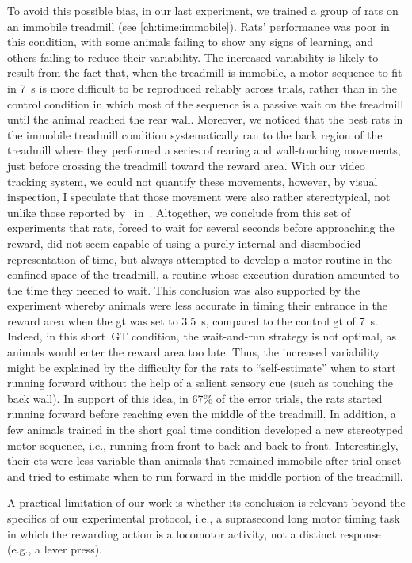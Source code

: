 To avoid this possible bias, in our last experiment, we trained a group of rats on an immobile treadmill (see \autoref{ch:time:immobile}).
Rats' performance was poor in this condition, with some animals failing to show any signs of learning, and others failing to reduce their variability.
The increased variability is likely to result from the fact that, when the treadmill is immobile, a motor sequence to fit in 7~s is more difficult to be reproduced reliably across trials, rather than in the control condition in which most of the sequence is a passive wait on the treadmill until the animal reached the rear wall.
Moreover, we noticed that the best rats in the immobile treadmill condition systematically ran to the back region of the treadmill where they performed a series of rearing and wall-touching movements, just before crossing the treadmill toward the reward area.
With our video tracking system, we could not quantify these movements, however, by visual inspection, I speculate that those movement were also rather stereotypical, not unlike those reported by~\citeauthor{Kawai2015} in~\cite{Kawai2015}.
Altogether, we conclude from this set of experiments that rats, forced to wait for several seconds before approaching the reward, did not seem capable of using a purely internal and disembodied representation of time, but always attempted to develop a motor routine in the confined space of the treadmill, a routine whose execution duration amounted to the time they needed to wait.
This conclusion was also supported by the experiment whereby animals were less accurate in timing their entrance in the reward area when the \gls{gt} was set to 3.5~s, compared to the control \gls{gt} of 7~s.
Indeed, in this short~GT condition, the wait-and-run strategy is not optimal, as animals would enter the reward area too late.
Thus, the increased variability might be explained by the difficulty for the rats to ``self-estimate'' when to start running forward without the help of a salient sensory cue (such as touching the back wall).
In support of this idea, in 67\% of the error trials, the rats started running forward before reaching even the middle of the treadmill.
In addition, a few animals trained in the short goal time condition developed a new stereotyped motor sequence, i.e., running from front to back and back to front.
Interestingly, their \glspl{et} were less variable than animals that remained immobile after trial onset and tried to estimate when to run forward in the middle portion of the treadmill.
\par
A practical limitation of our work is whether its conclusion is relevant beyond the specifics of our experimental protocol, i.e., a suprasecond long motor timing task in which the rewarding action is a locomotor activity, not a distinct response (e.g., a lever press).
